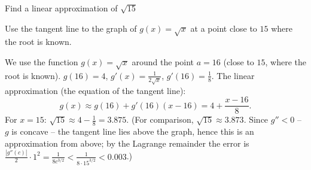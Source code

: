 
\begin{question}
Find a linear approximation of $\sqrt{15}$
\end{question}

\begin{hint}
Use the tangent line to the graph of $g(x)=\sqrt x$ at a point close to $15$ where the root is known.
\end{hint}

\begin{solution}
We use the function $g(x)=\sqrt x$ around the point $a=16$ (close to $15$, where the root is known). $g(16)=4$, $g'(x)=\frac{1}{2\sqrt x}$, $g'(16)=\frac18$. The linear approximation (the equation of the tangent line):
\[ g(x)\approx g(16)+g'(16)(x-16)=4+\frac{x-16}{8}. \]
For $x=15$: $\sqrt{15}\approx4-\frac18=\boxed{3.875}$.
(For comparison, $\sqrt{15}\approx3.873$. Since $g''<0$ -- $g$ is concave -- the tangent line lies above the graph, hence this is an approximation from above; by the Lagrange remainder the error is $\frac{|g''(c)|}{2}\cdot1^2=\frac{1}{8c^{3/2}}<\frac{1}{8\cdot 15^{3/2}}<0.003$.)
\end{solution}
